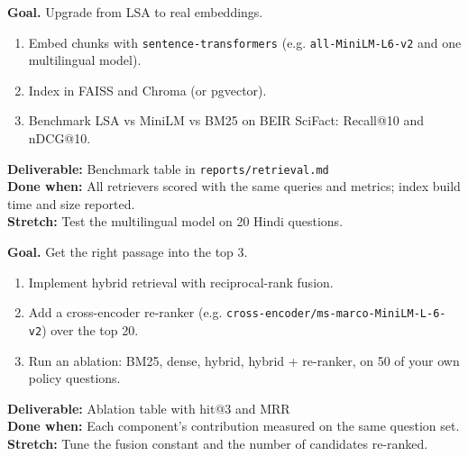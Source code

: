 \begin{tcolorbox}[enhanced,breakable,colback=white,colframe=sun,boxrule=0.8pt,arc=2pt,left=7pt,right=7pt,top=4pt,bottom=4pt,
  title={\bfseries Tuesday --- Neural embeddings and vector databases\hfill\normalfont\small 3 h},coltitle=white,colbacktitle=sun,fonttitle=\small]
\textbf{Goal.} Upgrade from LSA to real embeddings.
\begin{enumerate}[itemsep=1pt,topsep=2pt]
  \item Embed chunks with \texttt{sentence-transformers} (e.g. \texttt{all-MiniLM-L6-v2} and one multilingual model).
  \item Index in FAISS and Chroma (or pgvector).
  \item Benchmark LSA vs MiniLM vs BM25 on BEIR SciFact: Recall@10 and nDCG@10.
\end{enumerate}
\textbf{\color{dataC}Deliverable:} Benchmark table in \texttt{reports/retrieval.md}\\
\textbf{\color{navy}Done when:} All retrievers scored with the same queries and metrics; index build time and size reported.\\
\textbf{\color{skillC}Stretch:} Test the multilingual model on 20 Hindi questions.
\end{tcolorbox}

\begin{tcolorbox}[enhanced,breakable,colback=white,colframe=sun,boxrule=0.8pt,arc=2pt,left=7pt,right=7pt,top=4pt,bottom=4pt,
  title={\bfseries Wednesday --- Hybrid search and a cross-encoder re-ranker\hfill\normalfont\small 2--3 h},coltitle=white,colbacktitle=sun,fonttitle=\small]
\textbf{Goal.} Get the right passage into the top 3.
\begin{enumerate}[itemsep=1pt,topsep=2pt]
  \item Implement hybrid retrieval with reciprocal-rank fusion.
  \item Add a cross-encoder re-ranker (e.g. \texttt{cross-encoder/ms-marco-MiniLM-L-6-v2}) over the top 20.
  \item Run an ablation: BM25, dense, hybrid, hybrid + re-ranker, on 50 of your own policy questions.
\end{enumerate}
\textbf{\color{dataC}Deliverable:} Ablation table with hit@3 and MRR\\
\textbf{\color{navy}Done when:} Each component's contribution measured on the same question set.\\
\textbf{\color{skillC}Stretch:} Tune the fusion constant and the number of candidates re-ranked.
\end{tcolorbox}

